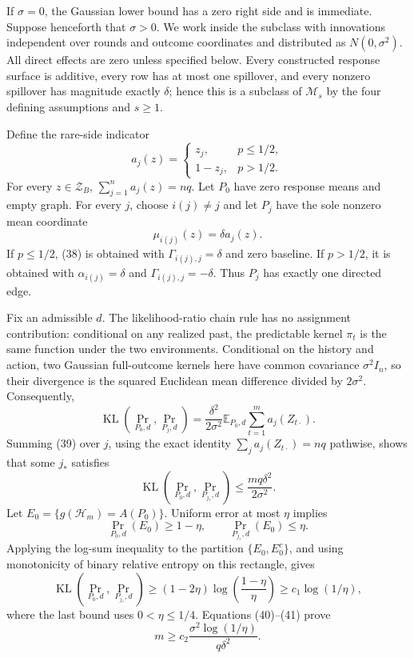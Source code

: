 If \(\sigma=0\), the Gaussian lower bound has a zero right side and is immediate.  Suppose henceforth that \(\sigma>0\).  We work inside the subclass with innovations independent over rounds and outcome coordinates and distributed as \(N(0,\sigma^2)\).  All direct effects are zero unless specified below.  Every constructed response surface is additive, every row has at most one spillover, and every nonzero spillover has magnitude exactly \(\delta\); hence this is a subclass of \(\mathcal M_s\) by the four defining assumptions and \(s\ge1\).

Define the rare-side indicator
\[
 a_j(z)=
 \begin{cases}
 z_j,&p\le1/2,\\
 1-z_j,&p>1/2.
 \end{cases}
 \tag{37}
\]
For every \(z\in\mathcal Z_B\), \(\sum_{j=1}^na_j(z)=nq\).  Let \(P_0\) have zero response means and empty graph.  For every \(j\), choose \(i(j)\ne j\) and let \(P_j\) have the sole nonzero mean coordinate
\[
 \mu_{i(j)}(z)=\delta a_j(z).
 \tag{38}
\]
If \(p\le1/2\), (38) is obtained with \(\Gamma_{i(j),j}=\delta\) and zero baseline.  If \(p>1/2\), it is obtained with \(\alpha_{i(j)}=\delta\) and \(\Gamma_{i(j),j}=-\delta\).  Thus \(P_j\) has exactly one directed edge.

Fix an admissible \(d\).  The likelihood-ratio chain rule has no assignment contribution: conditional on any realized past, the predictable kernel \(\pi_t\) is the same function under the two environments.  Conditional on the history and action, two Gaussian full-outcome kernels here have common covariance \(\sigma^2I_n\), so their divergence is the squared Euclidean mean difference divided by \(2\sigma^2\).  Consequently,
\[
 \operatorname{KL}(\Pr_{P_0,d},\Pr_{P_j,d})
 =\frac{\delta^2}{2\sigma^2}
   \mathbb E_{P_0,d}\sum_{t=1}^m a_j(Z_{t\cdot}).
 \tag{39}
\]
Summing (39) over \(j\), using the exact identity \(\sum_j a_j(Z_{t\cdot})=nq\) pathwise, shows that some \(j_*\) satisfies
\[
 \operatorname{KL}(\Pr_{P_0,d},\Pr_{P_{j_*},d})
 \le\frac{mq\delta^2}{2\sigma^2}.
 \tag{40}
\]
Let \(E_0=\{g(\mathscr H_m)=A(P_0)\}\).  Uniform error at most \(\eta\) implies
\[
 \Pr_{P_0,d}(E_0)\ge1-\eta,
 \qquad
 \Pr_{P_{j_*},d}(E_0)\le\eta.
\]
Applying the log-sum inequality to the partition \(\{E_0,E_0^c\}\), and using monotonicity of binary relative entropy on this rectangle, gives
\[
 \operatorname{KL}(\Pr_{P_0,d},\Pr_{P_{j_*},d})
 \ge(1-2\eta)\log\!\left(\frac{1-\eta}{\eta}\right)
 \ge c_1\log(1/\eta),
 \tag{41}
\]
where the last bound uses \(0<\eta\le1/4\).  Equations (40)--(41) prove
\[
 m\ge c_2\frac{\sigma^2\log(1/\eta)}{q\delta^2}.
 \tag{42}
\]

